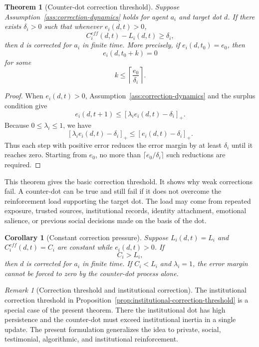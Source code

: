 \documentclass[11pt]{article}
\newtheorem{theorem}{Theorem}
\newtheorem{corollary}{Corollary}
\theoremstyle{remark}
\newtheorem{remark}{Remark}
\begin{document}
\begin{theorem}[Counter-dot correction threshold]\label{thm:counter-dot-correction-threshold}
Suppose Assumption~\ref{ass:correction-dynamics} holds for agent $a_i$
and target dot $d$. If there exists $\delta_i>0$ such that whenever
$e_i(d,t)>0$,
$$
C_i^{eff}(d,t)-L_i(d,t)\geq\delta_i,
$$
then $d$ is corrected for $a_i$ in finite time. More precisely, if
$e_i(d,t_0)=e_0$, then
$$
e_i(d,t_0+k)=0
$$
for some
$$
k\leq \left\lceil \frac{e_0}{\delta_i}\right\rceil.
$$
\end{theorem}

\begin{proof}
When $e_i(d,t)>0$, Assumption~\ref{ass:correction-dynamics} and the
surplus condition give
$$
e_i(d,t+1)\leq [\lambda_i e_i(d,t)-\delta_i]_+.
$$
Because $0\leq\lambda_i\leq1$, we have
$$
[\lambda_i e_i(d,t)-\delta_i]_+\leq[e_i(d,t)-\delta_i]_+.
$$
Thus each step with positive error reduces the error margin by at least
$\delta_i$ until it reaches zero. Starting from $e_0$, no more than
$\lceil e_0/\delta_i\rceil$ such reductions are required.
\end{proof}

This theorem gives the basic correction threshold. It shows why weak
corrections fail. A counter-dot can be true and still fail if it does not
overcome the reinforcement load supporting the target dot. The load may
come from repeated exposure, trusted sources, institutional records,
identity attachment, emotional salience, or previous social decisions
made on the basis of the dot.

\begin{corollary}[Constant correction pressure]\label{cor:constant-correction-pressure}
Suppose $L_i(d,t)=L_i$ and $C_i^{eff}(d,t)=C_i$ are constant while
$e_i(d,t)>0$. If
$$
C_i>L_i,
$$
then $d$ is corrected for $a_i$ in finite time. If $C_i<L_i$ and
$\lambda_i=1$, the error margin cannot be forced to zero by the
counter-dot process alone.
\end{corollary}


\begin{remark}[Correction threshold and institutional correction]
The institutional correction threshold in
Proposition~\ref{prop:institutional-correction-threshold} is a special
case of the present theorem. There the institutional dot has high
persistence and the counter-dot must exceed institutional inertia in a
single update. The present formulation generalizes the idea to private,
social, testimonial, algorithmic, and institutional reinforcement.
\end{remark}
\end{document}
